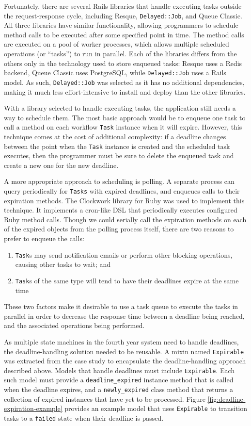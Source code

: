 \documentclass[document.tex]{subfiles}
\begin{document}
Fortunately, there are several Rails libraries that handle executing tasks outside the request-response cycle, including Resque, \verb!Delayed::Job!, and Queue Classic. All three libraries have similar functionality, allowing programmers to schedule method calls to be executed after some specified point in time. The method calls are executed on a pool of worker processes, which allows multiple scheduled operations (or ``tasks'') to run in parallel. Each of the libraries differs from the others only in the technology used to store enqueued tasks: Resque uses a Redis backend, Queue Classic uses PostgreSQL, while \verb!Delayed::Job! uses a Rails model. As such, \verb!Delayed::Job! was selected as it has no additional dependencies, making it much less effort-intensive to install and deploy than the other libraries.

With a library selected to handle executing tasks, the application still needs a way to schedule them. The most basic approach would be to enqueue one task to call a method on each workflow \verb!Task! instance when it will expire. However, this technique comes at the cost of additional complexity: if a deadline changes between the point when the \verb!Task! instance is created and the scheduled task executes, then the programmer must be sure to delete the enqueued task and create a new one for the new deadline.

A more appropriate approach to scheduling is polling. A separate process can query periodically for \verb!Tasks! with expired deadlines, and enqueues calls to their expiration methods. The Clockwork library for Ruby was used to implement this technique. It implements a cron-like DSL that periodically executes configured Ruby method calls. Though we could serially call the expiration methods on each of the expired objects from the polling process itself, there are two reasons to prefer to enqueue the calls:
\begin{enumerate}
\item \verb!Task!s may send notification emails or perform other blocking operations, causing other tasks to wait; and
\item \verb!Task!s of the same type will tend to have their deadlines expire at the same time
\end{enumerate}
These two factors make it desirable to use a task queue to execute the tasks in parallel in order to decrease the response time between a deadline being reached, and the associated operations being performed.

As multiple state machines in the fourth year system need to handle deadlines, the deadline-handling solution needed to be reusable. A mixin named \verb!Expirable! was extracted from the case study to encapsulate the deadline-handling approach described above. Models that handle deadlines must include \verb!Expirable!. Each such model must provide a \verb!deadline_expired! instance method that is called when the deadline expires, and a \verb!newly_expired! class method that returns a collection of expired instances that have yet to be processed. Figure \ref{fig:deadline-expiration-example} provides an example model that uses \verb!Expirable! to transition tasks to a \verb!failed! state when their deadline is passed.
\end{document}
